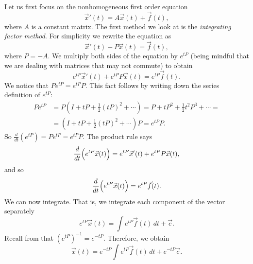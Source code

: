 Let us first focus on the nonhomogeneous first order equation
\begin{equation*}
{\vec{x}}'(t) = A\vec{x}(t) + \vec{f}(t) ,
\end{equation*}
where $A$ is a constant matrix.  The first method we look at is the
\emph{integrating factor method}.
For simplicity we rewrite the equation as
\begin{equation*}
{\vec{x}}'(t) + P \vec{x}(t) = \vec{f}(t) ,
\end{equation*}
where $P = -A$.
We multiply both sides of the
equation by $e^{tP}$ (being mindful that we are dealing with matrices that
may not commute) to obtain
\begin{equation*}
e^{tP}{\vec{x}}'(t) + e^{tP}P\vec{x}(t) = e^{tP}\vec{f}(t) .
\end{equation*}
We notice that $P e^{tP} = e^{tP} P$.  This fact follows by writing
down the series definition of $e^{tP}$:
\begin{equation*}
\begin{split}
P e^{tP} & = 
P \left(
I + tP + \frac{1}{2} {(tP)}^2 + \cdots \right)
=
P + tP^2 + \frac{1}{2} t^2P^3 + \cdots
=
\\
& =
\left(
I + tP + \frac{1}{2} {(tP)}^2 + \cdots \right) P 
= e^{tP} P . 
\end{split}
\end{equation*}
So $\frac{d}{dt} \left( e^{tP} \right) = P e^{tP} = e^{tP} P$.  The product
rule says
\begin{equation*}
\frac{d}{dt}
\Bigl( e^{tP} \vec{x}(t) \Bigr) =
e^{tP}{\vec{x}}'(t) + e^{tP}P\vec{x}(t),
\end{equation*}
and so
\begin{equation*}
\frac{d}{dt}
\Bigl( e^{tP} \vec{x}(t) \Bigr) = e^{tP}\vec{f}(t) .
\end{equation*}
We can now integrate.  That is, we integrate each component of the vector
separately
\begin{equation*}
e^{tP} \vec{x}(t) = \int e^{tP}\vec{f}(t) \, dt + \vec{c} .
\end{equation*}
Recall from  that ${(e^{tP})}^{-1} = e^{-tP}$.
Therefore, we obtain
\begin{equation*}
\vec{x}(t) = e^{-tP} \int e^{tP}\vec{f}(t) \, dt + e^{-tP} \vec{c} .
\end{equation*}

